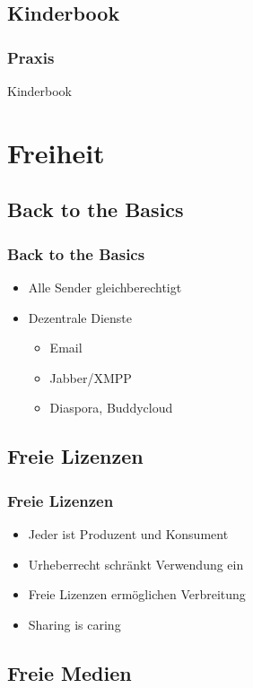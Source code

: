 \documentclass{beamer}
\begin{document}
\subsection{Kinderbook}

\begin{frame}
  \frametitle{Praxis}
  Kinderbook
\end{frame}

\section{Freiheit}

\subsection{Back to the Basics}

\begin{frame}
  \frametitle{Back to the Basics}
  \begin{itemize}
    \item<1-> Alle Sender gleichberechtigt
    \item<2-> Dezentrale Dienste
      \begin{itemize}
        \item<3-> Email
        \item<4-> Jabber/XMPP
        \item<5-> Diaspora, Buddycloud
      \end{itemize}
  \end{itemize}
\end{frame}

\subsection{Freie Lizenzen}

\begin{frame}
  \frametitle{Freie Lizenzen}
  \begin{itemize}
    \item<1-> Jeder ist Produzent und Konsument
    \item<2-> Urheberrecht schränkt Verwendung ein
    \item<3-> Freie Lizenzen ermöglichen Verbreitung
    \item<4-> Sharing is caring
  \end{itemize}
\end{frame}

\subsection{Freie Medien}
\end{document}
